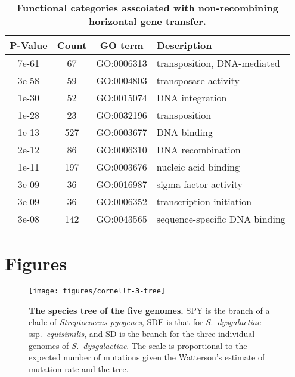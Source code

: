 \documentclass[10pt]{article}
\begin{document}
\begin{table}[!ht]
\caption{
\bf{Functional categories asscoiated with 
non-recombining horizontal gene transfer.}}
\noindent \begin{centering}
\begin{tabular}{cccl}
\hline 
P-Value & Count & GO term & Description \\
\hline 
7e-61 &  67 & GO:0006313 & transposition, DNA-mediated\\
3e-58 &  59 & GO:0004803 & transposase activity\\
1e-30 &  52 & GO:0015074 & DNA integration\\
1e-28 &  23 & GO:0032196 & transposition\\
1e-13 & 527 & GO:0003677 & DNA binding\\
2e-12 &  86 & GO:0006310 & DNA recombination\\
1e-11 & 197 & GO:0003676 & nucleic acid binding\\
3e-09 &  36 & GO:0016987 & sigma factor activity\\
3e-09 &  36 & GO:0006352 & transcription initiation\\
3e-08 & 142 & GO:0043565 & sequence-specific DNA binding\\
\hline 
\end{tabular}
\par\end{centering}
\label{tab:go-events}
\end{table}
\clearpage{}

\section*{Figures}

\begin{figure}[!ht]
\texttt{[image: figures/cornellf-3-tree]}
\caption{
{\bf The species tree of the five genomes.} 
SPY is the branch of a clade of \textit{Streptococcus
pyogenes}, SDE is that for \textit{S.\ dysgalactiae} ssp.\textit{\ equisimilis},
and SD is the branch for the three individual genomes of \textit{S.\
dysgalactiae}. The scale is proportional to the expected number of mutations
given the Watterson's estimate of mutation rate and the tree.}
\label{fig:tree5}
\end{figure}
\clearpage{}%
\end{document}
